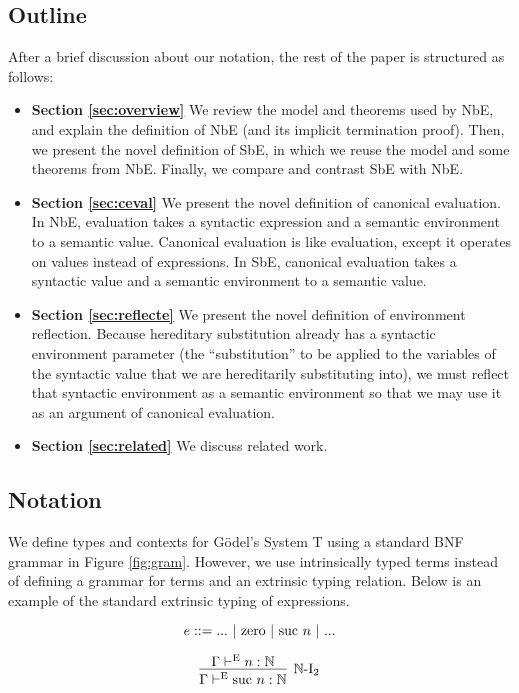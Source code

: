 \documentclass{llncs}
\newcommand{\reffig}[1]{Figure \ref{fig:#1}}
\newcommand{\refsec}[1]{Section \ref{sec:#1}}
\def\nat{\mathbb{N}}
\newcommand{\turn}[1]{\vdash^\con{#1}}
\newcommand{\con}[1]{\textmd{#1}}
\begin{document}
\subsection{Outline}

After a brief discussion about our notation, the rest of the paper is
structured as follows:

\begin{itemize}
\item{\bf{\refsec{overview}}}
We review the model and theorems used by NbE, and explain the
definition of NbE (and its implicit termination proof). Then, we present the
novel definition of SbE, in which we reuse the model and some theorems
from NbE. Finally, we compare and contrast SbE with NbE.

\item{\bf{\refsec{ceval}}}
We present the novel definition of canonical evaluation. In NbE,
evaluation takes a syntactic expression and a semantic environment to
a semantic value. Canonical evaluation is like evaluation, except it
operates on values instead of expressions. In SbE, canonical evaluation
takes a syntactic value and a semantic environment to
a semantic value.

\item{\bf{\refsec{reflecte}}}
We present the novel definition of environment reflection. Because
hereditary substitution already has a syntactic environment parameter
(the ``substitution'' to be applied to the variables of the syntactic
value that we are hereditarily substituting into), we must reflect that
syntactic environment as a semantic environment so that we may use it
as an argument of canonical evaluation.

\item{\bf{\refsec{related}}}
We discuss related work.
\end{itemize}

\subsection{Notation}

We define types and contexts for G{\"o}del's System T using a standard
BNF grammar in \reffig{gram}. However, we use intrinsically typed
terms instead of defining a grammar for terms and an extrinsic
typing relation. Below is an example of the standard extrinsic typing
of expressions.

$$
e ::= ... ~ | ~ \con{zero} ~ | ~ \con{suc} ~ n ~ | ~ ...
$$

$$
\infer
  [\nat\con{-I}_2]
  {\Gamma \turn{E} \con{suc} ~ n : \nat}
{
  \Gamma \turn{E} n : \nat
}
$$
\end{document}
